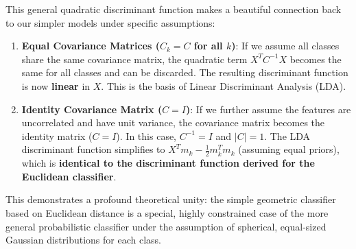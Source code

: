 \begin{remark}
This general quadratic discriminant function makes a beautiful connection back to our simpler models under specific assumptions:
\begin{enumerate}
    \item \textbf{Equal Covariance Matrices ($C_k = C$ for all $k$)}: If we assume all classes share the same covariance matrix, the quadratic term $X^T C^{-1} X$ becomes the same for all classes and can be discarded. The resulting discriminant function is now \textbf{linear} in $X$. This is the basis of Linear Discriminant Analysis (LDA).
    \item \textbf{Identity Covariance Matrix ($C = I$)}: If we further assume the features are uncorrelated and have unit variance, the covariance matrix becomes the identity matrix ($C=I$). In this case, $C^{-1}=I$ and $|C|=1$. The LDA discriminant function simplifies to $X^T m_k - \frac{1}{2}m_k^T m_k$ (assuming equal priors), which is \textbf{identical to the discriminant function derived for the Euclidean classifier}.
\end{enumerate}
This demonstrates a profound theoretical unity: the simple geometric classifier based on Euclidean distance is a special, highly constrained case of the more general probabilistic classifier under the assumption of spherical, equal-sized Gaussian distributions for each class.
\end{remark}